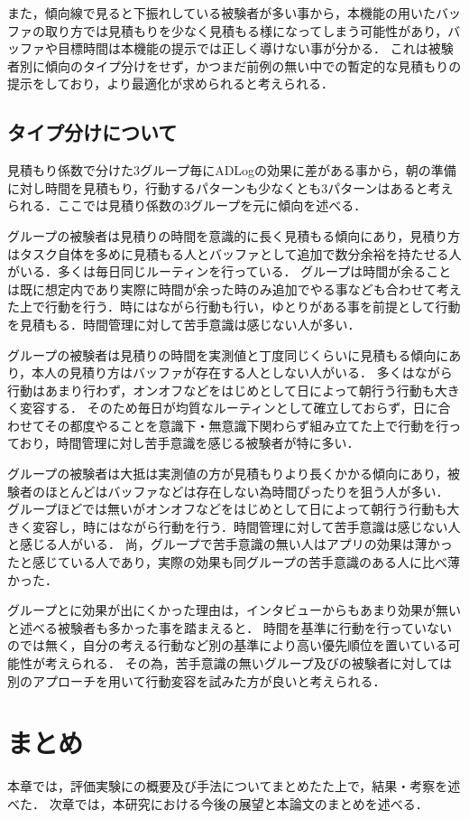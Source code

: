 また，傾向線で見ると下振れしている被験者が多い事から，本機能の用いたバッファの取り方では見積もりを少なく見積もる様になってしまう可能性があり，バッファや目標時間は本機能の提示では正しく導けない事が分かる．
これは被験者別に傾向のタイプ分けをせず，かつまだ前例の無い中での暫定的な見積もりの提示をしており，より最適化が求められると考えられる．

\subsection{タイプ分けについて}
見積もり係数で分けた3グループ毎にADLogの効果に差がある事から，朝の準備に対し時間を見積もり，行動するパターンも少なくとも3パターンはあると考えられる．ここでは見積り係数の3グループを元に傾向を述べる．

グループの被験者は見積りの時間を意識的に長く見積もる傾向にあり，見積り方はタスク自体を多めに見積もる人とバッファとして追加で数分余裕を持たせる人がいる．多くは毎日同じルーティンを行っている．
グループは時間が余ることは既に想定内であり実際に時間が余った時のみ追加でやる事なども合わせて考えた上で行動を行う．時にはながら行動も行い，ゆとりがある事を前提として行動を見積もる．時間管理に対して苦手意識は感じない人が多い．

グループの被験者は見積りの時間を実測値と丁度同じくらいに見積もる傾向にあり，本人の見積り方はバッファが存在する人としない人がいる．
多くはながら行動はあまり行わず，オンオフなどをはじめとして日によって朝行う行動も大きく変容する．
そのため毎日が均質なルーティンとして確立しておらず，日に合わせてその都度やることを意識下・無意識下関わらず組み立てた上で行動を行っており，時間管理に対し苦手意識を感じる被験者が特に多い．

グループの被験者は大抵は実測値の方が見積もりより長くかかる傾向にあり，被験者のほとんどはバッファなどは存在しない為時間ぴったりを狙う人が多い．
グループほどでは無いがオンオフなどをはじめとして日によって朝行う行動も大きく変容し，時にはながら行動を行う．時間管理に対して苦手意識は感じない人と感じる人がいる．
尚，グループで苦手意識の無い人はアプリの効果は薄かったと感じている人であり，実際の効果も同グループの苦手意識のある人に比べ薄かった．

グループとに効果が出にくかった理由は，インタビューからもあまり効果が無いと述べる被験者も多かった事を踏まえると．
時間を基準に行動を行っていないのでは無く，自分の考える行動など別の基準により高い優先順位を置いている可能性が考えられる．
その為，苦手意識の無いグループ及びの被験者に対しては別のアプローチを用いて行動変容を試みた方が良いと考えられる．

\section{まとめ}
本章では，評価実験にの概要及び手法についてまとめたた上で，結果・考察を述べた．
次章では，本研究における今後の展望と本論文のまとめを述べる．
